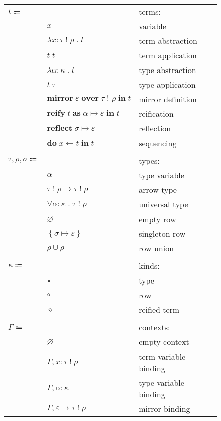 \documentclass[12pt]{article}
\newcommand\kAnno[2]{#1 : #2}
\newcommand\tAnno[3]{#1 : \tEmbellished{#2}{#3}}
\newcommand\mVar{\varepsilon}
\newcommand\rToM[2]{#1 \mapsto #2}
\newcommand\term{t}
\newcommand\eVar{x}
\newcommand\eAbs[4]{\lambda \tAnno{#1}{#2}{#3} \; . \; #4}
\newcommand\eApp[2]{#1 \; #2}
\newcommand\eTAbs[3]{\lambda \kAnno{#1}{#2} \; . \; #3}
\newcommand\eTApp[2]{#1 \; #2}
\newcommand\eMirror[4]{\textbf{mirror} \; #1 \; \textbf{over} \; \tEmbellished{#2}{#3} \; \textbf{in} \; #4}
\newcommand\eReify[4]{\textbf{reify} \; #1 \; \textbf{as} \; \rToM{#2}{#3} \; \textbf{in} \; #4}
\newcommand\eReflect[2]{\textbf{reflect} \; \rToM{#1}{#2}}
\newcommand\eDo[3]{\textbf{do} \; #1 \leftarrow #2 \; \textbf{in} \; #3}
\newcommand\type{\tau}
\newcommand\tVar{\alpha}
\newcommand\tArrow[4]{\tEmbellished{#1}{#2} \rightarrow \tEmbellished{#3}{#4}}
\newcommand\tForAll[4]{\forall \kAnno{#1}{#2} \; . \; \tEmbellished{#3}{#4}}
\newcommand\row{\rho}
\newcommand\tEmbellished[2]{#1 \; ! \; #2}
\newcommand\tEmpty{\varnothing}
\newcommand\tSingleton[2]{\left\{ \rToM{#1}{#2} \right\}}
\newcommand\tUnion[2]{#1 \cup #2}
\newcommand\reification{\sigma}
\newcommand\kind{\kappa}
\newcommand\kType{\star}
\newcommand\kRow{\circ}
\newcommand\kReification{\diamond}
\newcommand\context{\Gamma}
\newcommand\cEmpty{\varnothing}
\newcommand\cEExtend[4]{#1, \tAnno{#2}{#3}{#4}}
\newcommand\cTExtend[3]{#1, \kAnno{#2}{#3}}
\newcommand\cMExtend[4]{#1, #2 \mapsto \tEmbellished{#3}{#4}}
\begin{document}
      \begin{figure}[H]
        \begin{mdframed}[backgroundcolor=none]
          \begin{center}
            \begin{tabular}{l l l}
              $\term \Coloneqq$ & & terms: \\
              & $\eVar$ & variable \\
              & $\eAbs{\eVar}{\type}{\row}{\term}$ & term abstraction \\
              & $\eApp{\term}{\term}$ & term application \\
              & $\eTAbs{\tVar}{\kind}{\term}$ & type abstraction \\
              & $\eTApp{\term}{\type}$ & type application \\
              & $\eMirror{\mVar}{\type}{\row}{\term}$ & mirror definition \\
              & $\eReify{\term}{\tVar}{\mVar}{\term}$ & reification \\
              & $\eReflect{\reification}{\mVar}$ & reflection \\
              & $\eDo{\eVar}{\term}{\term}$ & sequencing \\
              \\
              $\type, \row, \reification \Coloneqq$ & & types: \\
              & $\tVar$ & type variable \\
              & $\tArrow{\type}{\row}{\type}{\row}$ & arrow type \\
              & $\tForAll{\tVar}{\kind}{\type}{\row}$ & universal type \\
              & $\tEmpty$ & empty row \\
              & $\tSingleton{\reification}{\mVar}$ & singleton row \\
              & $\tUnion{\row}{\row}$ & row union \\
              \\
              $\kind \Coloneqq$ & & kinds: \\
              & $\kType$ & type \\
              & $\kRow$ & row \\
              & $\kReification$ & reified term \\
              \\
              $\context \Coloneqq$ & & contexts: \\
              & $\cEmpty$ & empty context \\
              & $\cEExtend{\context}{\eVar}{\type}{\row}$ & term variable binding \\
              & $\cTExtend{\context}{\tVar}{\kind}$ & type variable binding \\
              & $\cMExtend{\context}{\mVar}{\type}{\row}$ & mirror binding \\
            \end{tabular}
          \end{center}


\end{mdframed}
\end{figure}
\end{document}
